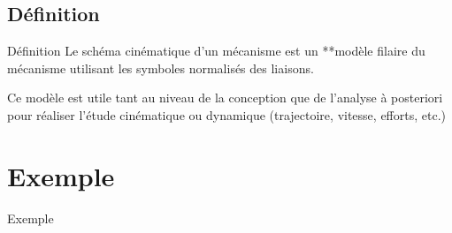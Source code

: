 \documentclass[
  ignorenonframetext,
  aspectratio=169,
  c]{beamer}
\begin{document}
\subsection{Définition}\label{duxe9finition}

\begin{frame}{Définition}
Le schéma cinématique d'un mécanisme est un **modèle filaire du
mécanisme utilisant les symboles normalisés des liaisons.

Ce modèle est utile tant au niveau de la conception que de l'analyse à
posteriori pour réaliser l'étude cinématique ou dynamique (trajectoire,
vitesse, efforts, etc.)
\end{frame}

\section{Exemple}\label{exemple}

\begin{frame}{Exemple}
\end{frame}
\end{document}
